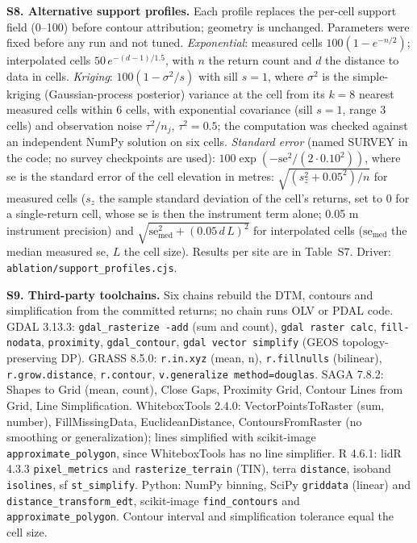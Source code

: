 \documentclass[11pt]{article}
\begin{document}
\vspace{4mm}
\noindent\textbf{S8. Alternative support profiles.} Each profile replaces the per-cell support field (0--100) before contour attribution; geometry is unchanged. Parameters were fixed before any run and not tuned. \emph{Exponential}: measured cells $100(1-e^{-n/2})$; interpolated cells $50\,e^{-(d-1)/1.5}$, with $n$ the return count and $d$ the distance to data in cells. \emph{Kriging}: $100(1-\sigma^2/s)$ with sill $s=1$, where $\sigma^2$ is the simple-kriging (Gaussian-process posterior) variance at the cell from its $k=8$ nearest measured cells within 6 cells, with exponential covariance (sill $s=1$, range 3 cells) and observation noise $\tau^2/n_j$, $\tau^2=0.5$; the computation was checked against an independent NumPy solution on six cells. \emph{Standard error} (named SURVEY in the code; no survey checkpoints are used): $100\exp(-\mathrm{se}^2/(2\cdot0.10^2))$, where se is the standard error of the cell elevation in metres: $\sqrt{(s_z^2+0.05^2)/n}$ for measured cells ($s_z$ the sample standard deviation of the cell's returns, set to 0 for a single-return cell, whose $\mathrm{se}$ is then the instrument term alone; 0.05 m instrument precision) and $\sqrt{\mathrm{se}_{\mathrm{med}}^2+(0.05\,d\,L)^2}$ for interpolated cells ($\mathrm{se}_{\mathrm{med}}$ the median measured se, $L$ the cell size). Results per site are in Table~S7. Driver: \texttt{ablation/support\_profiles.cjs}.

\vspace{4mm}
\noindent\textbf{S9. Third-party toolchains.} Six chains rebuild the DTM, contours and simplification from the committed returns; no chain runs OLV or PDAL code. GDAL 3.13.3: \texttt{gdal\_rasterize -add} (sum and count), \texttt{gdal raster calc}, \texttt{fill-nodata}, \texttt{proximity}, \texttt{gdal\_contour}, \texttt{gdal vector simplify} (GEOS topology-preserving DP). GRASS 8.5.0: \texttt{r.in.xyz} (mean, n), \texttt{r.fillnulls} (bilinear), \texttt{r.grow.distance}, \texttt{r.contour}, \texttt{v.generalize method=douglas}. SAGA 7.8.2: Shapes to Grid (mean, count), Close Gaps, Proximity Grid, Contour Lines from Grid, Line Simplification. WhiteboxTools 2.4.0: VectorPointsToRaster (sum, number), FillMissingData, EuclideanDistance, ContoursFromRaster (no smoothing or generalization); lines simplified with scikit-image \texttt{approximate\_polygon}, since WhiteboxTools has no line simplifier. R 4.6.1: lidR 4.3.3 \texttt{pixel\_metrics} and \texttt{rasterize\_terrain} (TIN), terra \texttt{distance}, isoband \texttt{isolines}, sf \texttt{st\_simplify}. Python: NumPy binning, SciPy \texttt{griddata} (linear) and \texttt{distance\_transform\_edt}, scikit-image \texttt{find\_contours} and \texttt{approximate\_polygon}. Contour interval and simplification tolerance equal the cell size.
\end{document}
